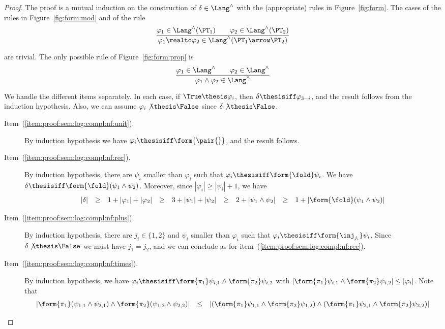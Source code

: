 \begin{proof}
The proof is a mutual induction on the construction of $\delta \in \Lang^\land$
with the (appropriate) rules in Figure~\ref{fig:form}.
The cases of the rules in Figure~\ref{fig:form:mod}
and of the rule
\[
\dfrac{\varphi_1 \in \Lang^\land(\PT_1)
  \qquad
  \varphi_2 \in \Lang^\land(\PT_2)}
  {\varphi_1 \realto \varphi_2 \in \Lang^\land(\PT_1 \arrow \PT_2)}
\]

\noindent
are trivial.
The only possible rule of
Figure~\ref{fig:form:prop}
is
\[
\dfrac{\varphi_1 \in \Lang^\land
  \qquad
  \varphi_2 \in \Lang^\land}
  {\varphi_1 \land \varphi_2 \in \Lang^\land}
\]

\noindent
We handle the different items separately.
In each case, if $\True \thesis \varphi_i$,
then $\delta \thesisiff \varphi_{3-i}$,
and the result follows from the induction hypothesis.
Also, we can assume $\varphi_i \not\thesis \False$
since $\delta \not\thesis \False$.
\begin{description}
\item[Item~(\ref{item:proof:sem:log:compl:nf:unit}).]
By induction hypothesis
we have $\varphi_i \thesisiff \form{\pair{}}$,
and the result follows.

\item[Item~(\ref{item:proof:sem:log:compl:nf:rec}).]
By induction hypothesis,
there are $\psi_i$ smaller than $\varphi_i$
such that
$\varphi_i \thesisiff \form{\fold}\psi_i$.
We have
$\delta \thesisiff \form{\fold}(\psi_1 \land \psi_2)$.
Moreover, since $|\varphi_i| \geq |\psi_i|+1$,
we have 
\[
\begin{array}{*{9}{l}}
  |\delta|
& \geq
& 1 + |\varphi_1| + |\varphi_2|
%
& \geq
& 3 + |\psi_1| + |\psi_2|
%
& \geq
& 2 + |\psi_1 \land \psi_2|
%
& \geq
& 1 + |\form{\fold}(\psi_1 \land \psi_2)|
\end{array}
\]

\item[Item~(\ref{item:proof:sem:log:compl:nf:plus}).]
By induction hypothesis,
there are $j_i \in \{1,2\}$
and $\psi_i$ smaller than $\varphi_i$
such that
$\varphi_i \thesisiff \form{\inj_{j_i}}\psi_i$.
Since $\delta \not\thesis \False$
we must have $j_1 = j_2$,
and
we can conclude as for item~(\ref{item:proof:sem:log:compl:nf:rec}).

\item[Item~(\ref{item:proof:sem:log:compl:nf:times}).]
By induction hypothesis,
we have
$\varphi_i \thesisiff \form{\pi_1}\psi_{i,1} \land \form{\pi_2}\psi_{i,2}$
with
$|\form{\pi_1}\psi_{i,1} \land \form{\pi_2}\psi_{i,2}| \leq |\varphi_i|$.
Note that
\[
\begin{array}{l l l}
  |\form{\pi_1}(\psi_{1,1} \land \psi_{2,1})
  \land \form{\pi_2}(\psi_{1,2} \land \psi_{2,2})|
& \leq
& 
  |(\form{\pi_1}\psi_{1,1} \land \form{\pi_2}\psi_{1,2})
   \land
   (\form{\pi_1}\psi_{2,1} \land \form{\pi_2}\psi_{2,2})|
\end{array}
\]


\end{description}
\end{proof}

